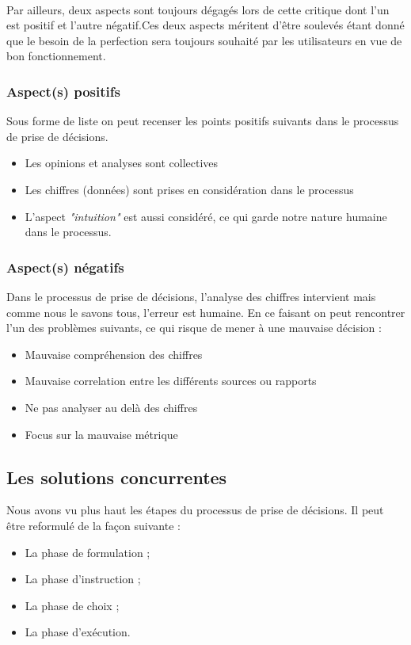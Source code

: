 \paragraph{}
Par ailleurs, deux aspects sont toujours dégagés lors de cette critique dont l'un est positif et l'autre négatif.Ces deux aspects méritent d'être soulevés étant donné que le besoin de la perfection sera toujours souhaité par les utilisateurs en vue de bon fonctionnement.

\subsubsection{Aspect(s) positifs}
Sous forme de liste on peut recenser les points positifs suivants dans le processus de prise de décisions.
\begin{itemize}
    \item Les opinions et analyses sont collectives
    \item Les chiffres (données) sont prises en considération dans le processus
    \item L'aspect \textit{"intuition"} est aussi considéré, ce qui garde notre nature humaine dans le processus.
\end{itemize}

\subsubsection{Aspect(s) négatifs}
Dans le processus de prise de décisions, l'analyse des chiffres intervient mais comme nous le savons tous, l'erreur est humaine. En ce faisant on peut rencontrer l'un des problèmes suivants, ce qui risque de mener à une mauvaise décision :

\begin{itemize}
    \item Mauvaise compréhension des chiffres
    \item Mauvaise correlation entre les différents sources ou rapports
    \item Ne pas analyser au delà des chiffres
    \item Focus sur la mauvaise métrique
\end{itemize}


\subsection{Les solutions concurrentes}
Nous avons vu plus haut les étapes du processus de prise de décisions. Il peut être reformulé de la façon suivante :
\begin{itemize}
    \item La phase de formulation ;
    \item La phase d’instruction ;
    \item La phase de choix ;
    \item La phase d’exécution.
\end{itemize}
